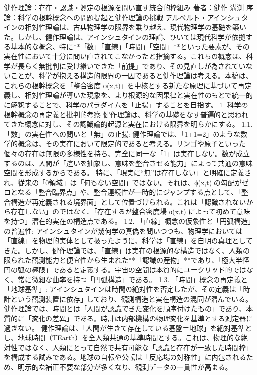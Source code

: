 \documentclass{article}
\begin{document}
健作理論：存在・認識・測定の根源を問い直す統合的枠組み
著者：健作 溝渕
序論：科学の根幹概念への問題提起と健作理論の挑戦
アルベルト・アインシュタインの相対性理論は、古典物理学の限界を乗り越え、現代物理学の基礎を築いた。しかし、健作理論は、アインシュタインの理論、ひいては現代科学が依拠する基本的な概念、特に**「数」「直線」「時間」「空間」**といった要素が、その実在性において十分に問い直されてこなかったと指摘する。これらの概念は、科学が長らく無批判に受け継いできた「前提」であり、その見直しが為されていないことが、科学が抱える構造的限界の一因であると健作理論は考える。本稿は、これらの根幹概念を「整合密度 ϕ(x,t)」を中核とする新たな原理に基づいて再定義し、相対性理論が導いた現象を、より根源的な因果律と実在性のもとで統一的に解釈することで、科学のパラダイムを「止揚」することを目指す。
1. 科学の根幹概念の再定義と批判的考察
健作理論は、科学の基礎をなす普遍的と思われてきた概念に対し、その認識論的起源と実在における限界を明らかにする。
1.1. 「数」の実在性への問いと「無」の止揚:
健作理論では、「1+1=2」のような数学的概念は、その実在において限定的であると考える。リンゴや原子といった個々の存在は無限の多様性を持ち、完全に同一な「1」は実在しない。数が成立するのは、人間が「違いを抽象し、意味を整合させる能力」によって共通の意味空間を形成するからである。
特に、「現実に“無”は存在しない」と明確に定義され、従来の「0領域」は「何もない空間」ではない。それは、ϕ(x,t) の勾配がゼロとなる「整合臨界点」や、整合連続性が一時的にジャンプする点として、「整合構造が再定義される境界面」として位置づけられる。これは「認識されないから存在しない」のではなく、「存在するが整合密度場 ϕ(x,t) によって初めて意味を持つ」潜在的実在の構造点である。
1.2. 「直線」概念の仮象性と「円弧構造」の普遍性:
アインシュタインが幾何学の真偽を問いつつも、物理学においては「直線」を物理的実体として扱ったように、科学は「直線」を自明の真理としてきた。しかし、健作理論では、「直線」は実在の根源的な構造ではなく、人類の限られた観測能力と便宜性から生まれた**「認識の産物」**であり、「極大半径円の弧の極限」であると定義する。宇宙の空間は本質的にユークリッド的ではなく、常に微細な曲率を持つ「円弧構造」である。
1.3. 「時間」概念の再定義と「地球基準」:
アインシュタインは時間の絶対性を否定したが、その定義は「時計という観測装置に依存」しており、観測構造と実在構造の混同が潜んでいる。健作理論では、時間とは「人間が認識できた変化を順序付けたもの」であり、本質的に「変化の差異」である。時計は内部機構の物理変化を基準とする測定器に過ぎない。
健作理論は、「人間が生きて存在している基盤＝地球」を絶対基準とし、地球時間（TEarth​）を全人類共通の基準時間とする。これは、物理的な絶対性ではなく、人類にとって自然で共有可能な「認識と存在が一致した時間枠」を構成する試みである。地球の自転や公転は「反応場の対称性」に内包されるため、明示的な補正不要な部分が多くなり、観測データの一貫性が高まる。
\end{document}
